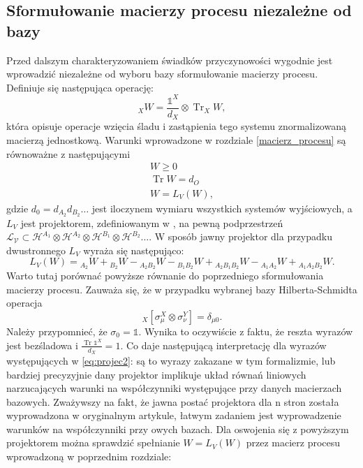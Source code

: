 \documentclass[10pt]{article} %
\DeclareMathOperator{\Trs}{Tr}
\newcommand{\Hx}[1]{\mathcal{H}^{#1}}
\newcommand{\I}{\mathbb{1}}
\begin{document}
\subsection{Sformułowanie macierzy procesu niezależne od bazy}
Przed dalszym charakteryzowaniem świadków przyczynowości wygodnie jest wprowadzić niezależne od wyboru bazy sformułowanie macierzy procesu.
Definiuje się następująca operację:
\begin{equation}
{}_X W = \frac{\I^X}{d_X} \otimes \Trs_X W,
\end{equation}
która opisuje operacje wzięcia śladu i zastąpienia tego systemu znormalizowaną macierzą jednostkową.
Warunki wprowadzone w rozdziale \ref{macierz_procesu} są równoważne z następującymi
\begin{gather}
W \geq 0 \\
\Trs W = d_O \\
W = L_V\left(W\right),
\end{gather}
gdzie $d_0 = d_{A_2} d_{B_2} \dots$ jest iloczynem wymiaru wszystkich systemów wyjściowych, a $L_V$ jest projektorem, zdefiniowanym w \cite{causal_witness}, na pewną podprzestrzeń 
$\mathcal{L_V} \subset \Hx{A_1} \otimes \Hx{A_2} \otimes \Hx{B_1} \otimes \Hx{B_2} \dots$.
W sposób jawny projektor dla przypadku dwustronnego $L_V$ wyraża się następująco:
\begin{equation}
\label{eq:projec2}
L_V(W) = {}_{A_2}W + {}_{B_2}W - {}_{A_2B_2}W - {}_{B_1B_2}W + {}_{A_2B_1B_2}W - {}_{A_1A_2}W + {}_{A_1A_2B_2}W.
\end{equation}
Warto tutaj porównać powyższe równanie do poprzedniego sformułowania macierzy procesu. Zauważa się, że w przypadku wybranej bazy Hilberta-Schmidta
operacja
\begin{equation}
{}_X\left[\sigma_\mu^X \otimes \sigma_\nu^Y\right] = \delta_{\mu0}.
\end{equation}
Należy przypomnieć, że $\sigma_0 = \I$.
Wynika to oczywiście z faktu, że reszta wyrazów jest bezśladowa i $\frac{\Trs \I^X}{d_X} = 1$. Co daje następującą interpretację dla wyrazów występujących w \eqref{eq:projec2}: są to wyrazy zakazane w tym formalizmie, lub bardziej precyzyjnie dany projektor implikuje układ równań liniowych narzucających warunki na współczynniki występujące przy danych macierzach bazowych. Zważywszy na fakt, że jawna postać projektora dla n stron została wyprowadzona w oryginalnym artykule, łatwym zadaniem jest wyprowadzenie warunków na współczynniki przy owych bazach. 
Dla oswojenia się z powyższym projektorem można sprawdzić spełnianie $W = L_V(W)$ przez macierz procesu wprowadzoną w poprzednim rozdziale:
\end{document}
